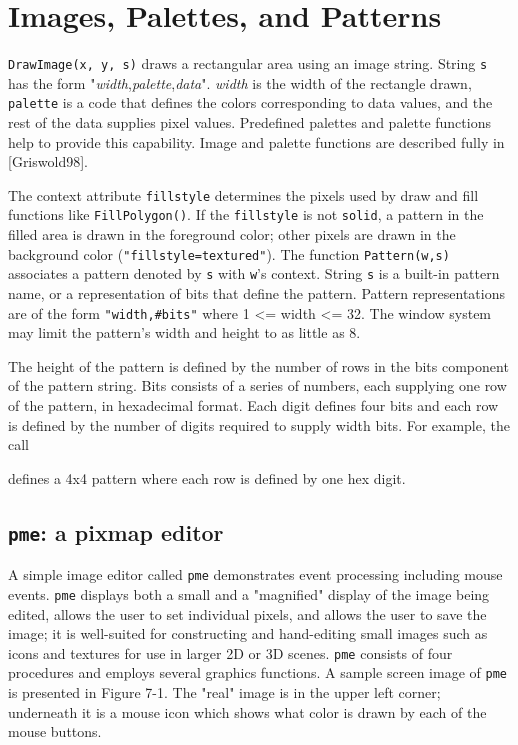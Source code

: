 \section{Images, Palettes, and Patterns}

\texttt{DrawImage(x, y, s)} draws a rectangular area using an image
string.  String \texttt{s} has the form
"\textit{width},\textit{palette},\textit{data}".  \textit{width} is
the width of the rectangle drawn, \texttt{palette} is a code that
defines the colors corresponding to data values, and the rest of the
data supplies pixel values. Predefined palettes and palette functions
help to provide this capability. Image and palette functions are
described fully in [Griswold98].

The context attribute \texttt{fillstyle} determines the pixels used by
draw and fill functions like \texttt{FillPolygon()}.  If the
\texttt{fillstyle} is not \texttt{solid}, a pattern in the filled area
is drawn in the foreground color; other pixels are drawn in the
background color (\texttt{"fillstyle=textured"}).  The function
\texttt{Pattern(w,s)} associates a pattern denoted by \texttt{s} with
\texttt{w}'s context. String \texttt{s} is a built-in pattern name, or
a representation of bits that define the pattern. Pattern
representations are of the form \texttt{"width,\#bits"} where 1
{\textless}= width {\textless}= 32. The window system may limit the
pattern's width and height to as little as 8.

The height of the pattern is defined by the number of rows in the bits
component of the pattern string. Bits consists of a series of numbers,
each supplying one row of the pattern, in hexadecimal format.  Each
digit defines four bits and each row is defined by the number of
digits required to supply width bits. For example, the call


\noindent defines a 4x4 pattern where each row is defined by one hex digit.

\subsection*{\texttt{pme}: a pixmap editor}

A simple image editor called \texttt{pme} demonstrates event
processing including mouse events. \texttt{pme} displays both a small
and a "magnified" display of the image being edited, allows the user
to set individual pixels, and allows the user to save the image; it is
well-suited for constructing and hand-editing small images such as
icons and textures for use in larger 2D or 3D scenes.  \texttt{pme}
consists of four procedures and employs several graphics functions. A
sample screen image of \texttt{pme} is presented in Figure 7-1. The
"real" image is in the upper left corner; underneath it is a mouse
icon which shows what color is drawn by each of the mouse buttons.




